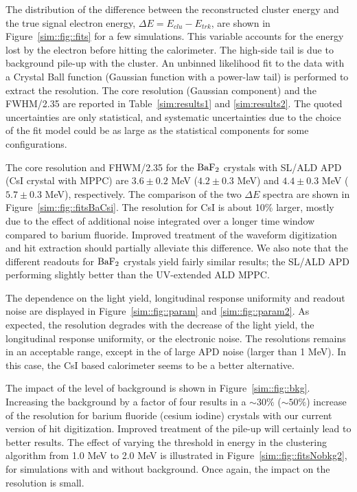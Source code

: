 The distribution of the difference between the reconstructed cluster energy and the true signal electron energy, $\Delta E = E_{clu}-E_{trk}$, 
are shown in Figure~\ref{sim::fig::fits} for a few simulations. This variable accounts for the energy lost by the electron before hitting 
the calorimeter. The high-side tail is due to background pile-up with the cluster. An unbinned likelihood fit to the data with a Crystal 
Ball function (Gaussian function with a power-law tail) is performed to extract the resolution. The core resolution (Gaussian component) 
and the FWHM/2.35 are reported in Table~\ref{sim:results1} and \ref{sim:results2}. The quoted uncertainties are only statistical, and 
systematic uncertainties due to the choice of the fit model could be as large as the statistical components for some configurations. 

The core resolution and FHWM/2.35 for the $\rm BaF_2$ crystals with SL/ALD APD (CsI crystal with MPPC) are $3.6 \pm 0.2$ MeV ($ 4.2 \pm 0.3$ MeV) 
and $4.4\pm 0.3$ MeV ($5.7 \pm 0.3$ MeV), respectively. The comparison of the two $\Delta E$ spectra are shown in Figure~\ref{sim::fig::fitsBaCsi}. 
The resolution for CsI is about 10\% larger, mostly due to the effect of additional noise integrated over a longer time window compared to 
barium fluoride. Improved treatment of the waveform digitization and hit extraction should partially alleviate this difference. We also note 
that the different readouts for $\rm BaF_2$ crystals yield fairly similar results; the SL/ALD APD performing slightly better than the 
UV-extended ALD MPPC.

The dependence on the light yield, longitudinal response uniformity and readout noise are displayed in Figure~\ref{sim::fig::param} 
and \ref{sim::fig::param2}. As expected, the resolution degrades with the decrease of the light yield, the longitudinal response uniformity, 
or the electronic noise. The resolutions remains in an acceptable range, except in the of large APD noise (larger than 1 MeV). In this 
case, the CsI based calorimeter seems to be a better alternative. 

The impact of the level of background is shown in Figure~\ref{sim::fig::bkg}. Increasing the background by a factor of four results in a $\sim30\%$ 
($\sim 50\%$) increase of the resolution for barium fluoride (cesium iodine) crystals with our current version of hit digitization. Improved treatment 
of the pile-up will certainly lead to better results. The effect of varying the threshold in energy in the clustering algorithm from 1.0 MeV to 2.0 MeV 
is illustrated in Figure~\ref{sim::fig::fitsNobkg2}, for simulations with and without background. Once again, the impact on the resolution is small.

